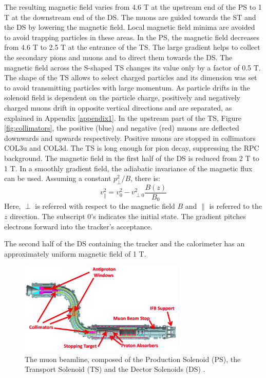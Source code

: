The resulting magnetic field varies from 4.6 T at the upstream end of the PS 
to 1 T at the downstream end of the DS. 
The muons are guided towards the ST and the DS by lowering the magnetic field. 
Local magnetic field minima are avoided to avoid trapping particles in these areas. 
In the PS, the magnetic field decreases from 4.6 T to 2.5 T at the entrance of 
the TS. The large gradient helps to collect the secondary pions and muons and to 
direct them towards the DS. The magnetic field across the S-shaped TS changes its 
value only by a factor of 0.5 T. The shape of the TS allows to select charged particles 
and its dimension was set to avoid transmitting 
particles with large momentum. As particle drifts in the solenoid field is dependent on the particle charge,  
positively and negatively charged muons 
drift in opposite vertical directions and are separated, as explained in Appendix 
\ref{appendix1}. In the upstream part of the TS, Figure 
\ref{fig:collimators}, the positive (blue) and negative (red) muons 
are deflected downwards and upwards respectively. Positive muons are stopped in 
collimators COL3u and COL3d. The TS is long enough for pion decay, suppressing 
the RPC background.
The magnetic field in the first half of 
the DS is reduced from 2 T to 1 T. In a smoothly gradient field, the adiabatic 
invariance of the magnetic flux can be used. Assuming a constant $p^2_\perp/B$, there is:
\begin{equation}
    v^2_{\parallel}=v^2_0-v^2_{\perp 0}\frac{B(z)}{B_0}
\end{equation}
Here, $\perp$ is referred with respect to the magnetic field $B$ and $\parallel$ is 
referred to the $z$ direction. The subscript 0's indicates the initial state. 
The gradient pitches electrons forward into the tracker's acceptance. 

The second half of the DS containing the tracker and the calorimeter has
an approximately uniform magnetic field of 1 T.

\begin{figure}[!h]
\centering
\includegraphics[width =0.7\textwidth]{figures/png/Screenshot_20240303_152845.png}
\caption[The muon beamline.]{The muon beamline, composed of the Production Solenoid (PS), 
the Transport Solenoid (TS) and the Dector Solenoids (DS) \cite{ginther}. 
}
\label{fig:muonbeamline}
\end{figure}


